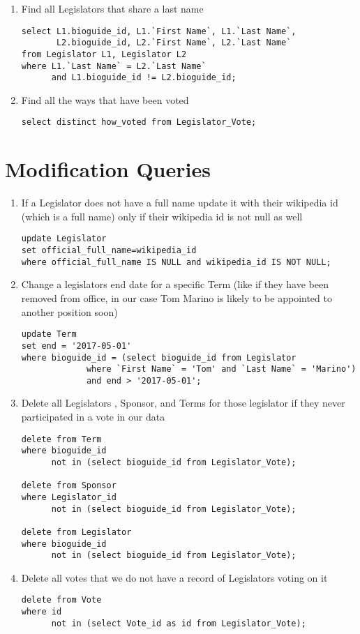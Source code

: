 \documentclass[11pt]{article}
\begin{document}
\begin{enumerate}
\item Find all Legislators that share a last name
\begin{verbatim}
select L1.bioguide_id, L1.`First Name`, L1.`Last Name`,
       L2.bioguide_id, L2.`First Name`, L2.`Last Name` 
from Legislator L1, Legislator L2 
where L1.`Last Name` = L2.`Last Name` 
      and L1.bioguide_id != L2.bioguide_id;
\end{verbatim}

\item Find all the ways that have been voted
\begin{verbatim}
select distinct how_voted from Legislator_Vote;
\end{verbatim}
\end{enumerate}

\section{Modification Queries}
\label{sec-2}


\begin{enumerate}
\item If a Legislator does not have a full name update it with 
their wikipedia id (which is a full name) only if 
their wikipedia id is not null as well
\begin{verbatim}
update Legislator 
set official_full_name=wikipedia_id 
where official_full_name IS NULL and wikipedia_id IS NOT NULL;
\end{verbatim}

\item Change a legislators end date for a specific Term
(like if they have been removed from office, 
 in our case Tom Marino is likely to be appointed to another position soon)
\begin{verbatim}
update Term
set end = '2017-05-01'
where bioguide_id = (select bioguide_id from Legislator 
		     where `First Name` = 'Tom' and `Last Name` = 'Marino') 
		     and end > '2017-05-01';
\end{verbatim}

\item Delete all Legislators , Sponsor, and Terms for those legislator 
if they never participated in a vote in our data
\begin{verbatim}
delete from Term 
where bioguide_id 
      not in (select bioguide_id from Legislator_Vote);

delete from Sponsor 
where Legislator_id 
      not in (select bioguide_id from Legislator_Vote);

delete from Legislator 
where bioguide_id 
      not in (select bioguide_id from Legislator_Vote);
\end{verbatim}

\item Delete all votes that we do not have a record of Legislators voting on it
\begin{verbatim}
delete from Vote 
where id 
      not in (select Vote_id as id from Legislator_Vote);
\end{verbatim}
\end{enumerate}
\end{document}
